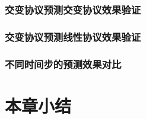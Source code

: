 \subsubsection{交变协议预测交变协议效果验证}
\subsubsection{交变协议预测线性协议效果验证}
\subsubsection{不同时间步的预测效果对比}
\section{本章小结}













